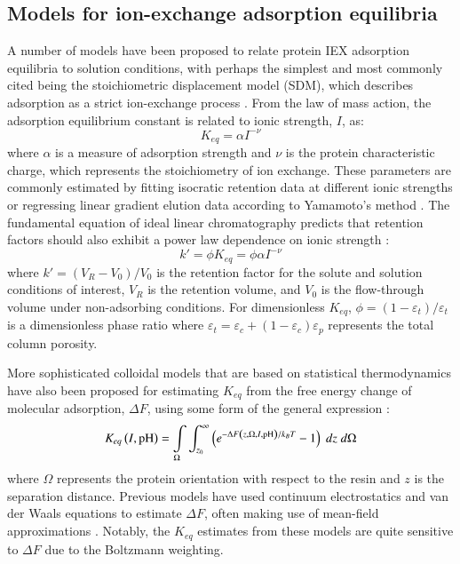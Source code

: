 \documentclass[preprint,review,12pt]{elsarticle}
\begin{document}
    \subsection{Models for ion-exchange adsorption equilibria} \label{ssec:electrostatics}
        A number of models have been proposed to relate protein IEX adsorption equilibria to solution conditions, with perhaps the simplest and most commonly cited being the stoichiometric displacement model (SDM), which describes adsorption as a strict ion-exchange process \cite{Boardman1955}. From the law of mass action, the adsorption equilibrium constant is related to ionic strength, $I$, as:
        \begin{equation} \label{eq:sdm}
            K_{eq} = \alpha I^{-\nu}
        \end{equation}
        where $\alpha$ is a measure of adsorption strength and $\nu$ is the protein characteristic charge, which represents the stoichiometry of ion exchange. These parameters are commonly estimated by fitting isocratic retention data at different ionic strengths or regressing linear gradient elution data according to Yamamoto's method \cite{Yamamoto1987}. The fundamental equation of ideal linear chromatography predicts that retention factors should also exhibit a power law dependence on ionic strength \cite{Guiochon2006}:
        \begin{equation} \label{eq:fundamental}
            k' = \phi K_{eq} = \phi \alpha I^{-\nu}
        \end{equation}
        where $k' = (V_R - V_0)/V_0$ is the retention factor for the solute and solution conditions of interest, $V_R$ is the retention volume, and $V_0$ is the flow-through volume under non-adsorbing conditions. For dimensionless $K_{eq}$, $\phi = (1 - \varepsilon_t)/\varepsilon_t$ is a dimensionless phase ratio where $\varepsilon_t = \varepsilon_c + (1 - \varepsilon_c) \varepsilon_p$ represents the total column porosity.

        More sophisticated colloidal models that are based on statistical thermodynamics have also been proposed for estimating $K_{eq}$ from the free energy change of molecular adsorption, $\Delta F$, using some form of the general expression \cite{Asthagiri1997}:
        \begin{equation} \label{eq:keq stat thermo}
            K_{eq}\left(I, \mathrm{pH} \right) = \int \displaylimits_\Omega \int_{z_0}^{\infty} \left( e^{-\Delta F \left( z, \Omega, I, \mathrm{pH} \right)/k_BT} - 1 \right) \; dz \; d\Omega
        \end{equation}
        where $\Omega$ represents the protein orientation with respect to the resin and $z$ is the separation distance. Previous models have used continuum electrostatics and van der Waals equations to estimate $\Delta F$, often making use of mean-field approximations \cite{Guelat2012, Briskot2019}. Notably, the $K_{eq}$ estimates from these models are quite sensitive to $\Delta F$ due to the Boltzmann weighting.
\end{document}
